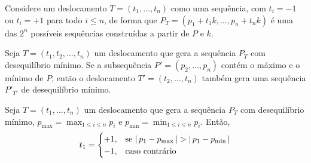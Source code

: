 Considere um deslocamento $T = (t_1, \ldots, t_n)$ como uma sequência, com $t_i = -1$ ou $t_i = +1$ para todo $i \leq n$, de forma que $P_T = (p_1 + t_1 k, \ldots, p_n + t_n k)$ é uma das $2^n$ possíveis sequências construídas a partir de $P$ e $k$.

\begin{theorem}
    Seja $T = (t_1, t_2, \ldots, t_n)$ um deslocamento que gera a sequência $P_T$ com desequilíbrio mínimo. Se a subsequência $P' = (p_2, \ldots, p_n)$ contém o máximo e o mínimo de $P$, então o deslocamento $T' = (t_2, \ldots, t_n)$ também gera uma sequência $P'_{T'}$ de desequilíbrio mínimo.
\end{theorem}

\begin{theorem}
    Seja $T = (t_1, \ldots, t_n)$ um deslocamento que gera a sequência $P_T$ com desequilíbrio mínimo, $p_{\max} = \max_{1 \leq i \leq n} p_i$ e $p_{\min} = \min_{1 \leq i \leq n} p_i$. Então,
    \[
        t_1 = \begin{cases}
            +1, & \text{se } {\lvert\,p_1 - p_{\max}\,\rvert} > {\lvert\,p_1 - p_{\min}\,\rvert} \\
            -1, & \text{caso contrário}
        \end{cases}
    \]
\end{theorem}
